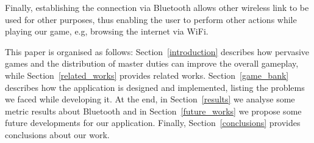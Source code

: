 Finally, establishing the connection via Bluetooth
allows other wireless link to be used for other purposes, thus enabling the
user to perform other actions while playing our game, e.g, browsing the
internet via WiFi.

This paper is organised as follows: Section~\ref{introduction} describes how 
pervasive games and the distribution of master duties can improve the 
overall gameplay, while Section~\ref{related_works} provides related works. 
Section~\ref{game_bank} describes how the application is designed and 
implemented, listing the problems we faced while developing it. At the end, in 
Section~\ref{results} we analyse some metric results about Bluetooth and in 
Section~\ref{future_works} we propose some future developments for our 
application. Finally, Section~\ref{conclusions} provides conclusions about our 
work.
